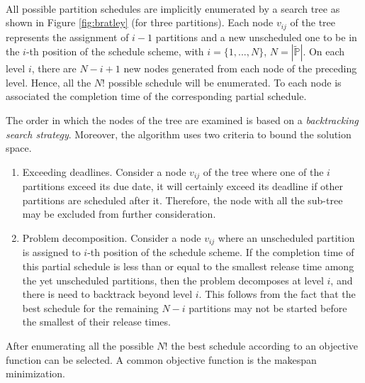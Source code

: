 \paragraph{} All possible partition schedules are implicitly enumerated by a search tree as shown in Figure \ref{fig:bratley} (for three partitions). Each node $v_{ij}$ of the tree represents the assignment of $i-1$ partitions and a new unscheduled one to be in the $i$-th position of the schedule scheme, with $i = \{1,...,N\}$, $N=|\widetilde{\mathbb{P}}|$. On each level $i$, there are $N-i+1$ new nodes generated from each node of the preceding level. Hence, all the $N!$ possible schedule will be enumerated. To each node is associated the completion time of the corresponding partial schedule.
\par The order in which the nodes of the tree are examined is based on a \emph{backtracking
search strategy}. Moreover, the algorithm uses two criteria to bound the solution space.
\begin{enumerate}
\item Exceeding deadlines. Consider a node $v_{ij}$ of the tree where one of the $i$ partitions exceed its due date, it will certainly exceed its deadline if other partitions are scheduled after it. Therefore, the node with all the sub-tree may be excluded from further consideration.
\item Problem decomposition. Consider a node $v_{ij}$ where an unscheduled partition is assigned to $i$-th position of the schedule scheme. If the completion time of this partial schedule is less than or equal to the smallest release time among the yet unscheduled partitions, then the problem decomposes at level $i$, and there is need to backtrack beyond level $i$. This follows from the fact that the best schedule for the remaining $N-i$ partitions may not be started before the smallest of their release times.
\end{enumerate}
After enumerating all the possible $N!$ the best schedule according to an objective function can be selected. A common objective function is the makespan minimization.

